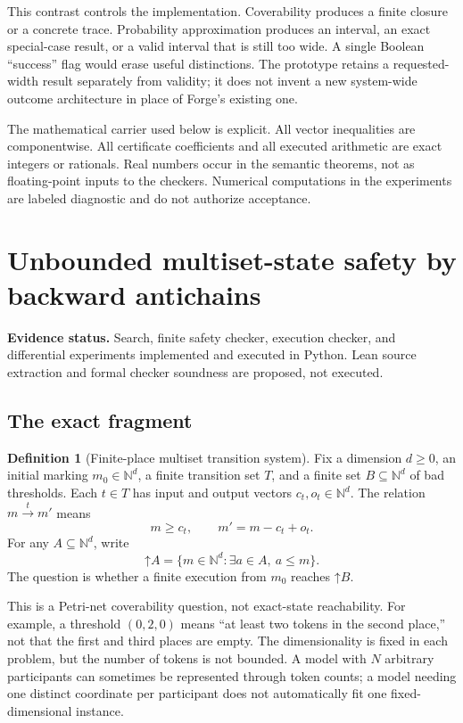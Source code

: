 \documentclass[11pt,a4paper]{article}
\theoremstyle{definition}\newtheorem{definition}[theorem]{Definition}
\theoremstyle{remark}\newtheorem{remark}[theorem]{Remark}
\newcommand{\N}{\mathbb N}\newcommand{\Q}{\mathbb Q}\newcommand{\R}{\mathbb R}
\newcommand{\up}[1]{\mathord{\uparrow}#1}
\newcommand{\status}[1]{\noindent\textbf{Evidence status.} #1\par}
\begin{document}
This contrast controls the implementation. Coverability produces a finite closure or a concrete trace. Probability approximation produces an interval, an exact special-case result, or a valid interval that is still too wide. A single Boolean ``success'' flag would erase useful distinctions. The prototype retains a requested-width result separately from validity; it does not invent a new system-wide outcome architecture in place of Forge's existing one.

The mathematical carrier used below is explicit. All vector inequalities are componentwise. All certificate coefficients and all executed arithmetic are exact integers or rationals. Real numbers occur in the semantic theorems, not as floating-point inputs to the checkers. Numerical computations in the experiments are labeled diagnostic and do not authorize acceptance.



\section{Unbounded multiset-state safety by backward antichains}
\label{sec:petri}
\status{Search, finite safety checker, execution checker, and differential experiments implemented and executed in Python. Lean source extraction and formal checker soundness are proposed, not executed.}

\subsection{The exact fragment}
\begin{definition}[Finite-place multiset transition system]
Fix a dimension $d\ge0$, an initial marking $m_0\in\N^d$, a finite transition set $T$, and a finite set $B\subseteq\N^d$ of bad thresholds. Each $t\in T$ has input and output vectors $c_t,o_t\in\N^d$. The relation $m\xrightarrow{t}m'$ means
\[
 m\ge c_t,\qquad m'=m-c_t+o_t.
\]
For any $A\subseteq\N^d$, write
\[
 \up A=\{m\in\N^d:\exists a\in A,\ a\le m\}.
\]
The question is whether a finite execution from $m_0$ reaches $\up B$.
\end{definition}

This is a Petri-net coverability question, not exact-state reachability. For example, a threshold $(0,2,0)$ means ``at least two tokens in the second place,'' not that the first and third places are empty. The dimensionality is fixed in each problem, but the number of tokens is not bounded. A model with $N$ arbitrary participants can sometimes be represented through token counts; a model needing one distinct coordinate per participant does not automatically fit one fixed-dimensional instance.
\end{document}
